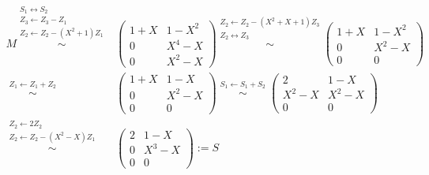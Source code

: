 \documentclass[../../main.tex]{subfiles}
\begin{document}
\begin{bsp}
\begin{enumerate}[\normalfont(a)]
\begin{align*}
M\stackrel{\begin{smallmatrix*}S_1\leftrightarrow S_2\\Z_3\leftarrow Z_3-Z_1\\ Z_2\leftarrow Z_2-(X^2+1)Z_1\end{smallmatrix*}}{\sim}&\begin{pmatrix}1+X & 1-X^2\\ 0 & X^4-X\\ 0 & X^2-X\end{pmatrix}\stackrel{\begin{smallmatrix*}Z_2\leftarrow Z_2-(X^2+X+1)Z_3\\ Z_2\leftrightarrow Z_3\end{smallmatrix*}}{\sim}\begin{pmatrix}1+X & 1-X^2\\ 0 & X^2-X\\ 0 & 0\end{pmatrix}\\
\stackrel{\begin{smallmatrix*}Z_1\leftarrow Z_1+Z_2\end{smallmatrix*}}{\sim}&\begin{pmatrix}1+X & 1-X\\ 0 & X^2-X\\ 0 & 0\end{pmatrix}\stackrel{\begin{smallmatrix*}S_1\leftarrow S_1+S_2\end{smallmatrix*}}{\sim}\begin{pmatrix}2 & 1-X\\ X^2-X & X^2-X\\ 0 & 0\end{pmatrix}\\
\stackrel{\begin{smallmatrix*}Z_2\leftarrow 2Z_2\\ Z_2\leftarrow Z_2-(X^2-X)Z_1\end{smallmatrix*}}{\sim}&\begin{pmatrix}2 & 1-X\\ 0 & X^3-X\\ 0 & 0\end{pmatrix}:=S
\end{align*}
\end{enumerate}
\end{bsp}
\end{document}
